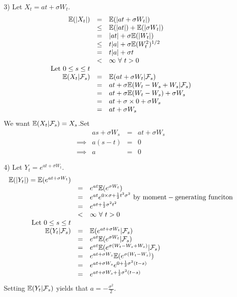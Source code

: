 \documentclass[11pt,a4paper]{article}
\begin{document}
\begin{itemize}
	\item[3)] Let $X_t=at+\sigma W_t$.
		\[\begin{array}{rcl}
		\mathbb{E}(|X_t|)&=&\mathbb{E}(|at+\sigma W_t|)\\
		&\leq&\mathbb{E}(|at|)+\mathbb{E}(|\sigma W_t|)\\
		&=&|at|+\sigma\mathbb{E}(|W_t|)\\
		&\leq&t|a|+\sigma\mathbb{E}(W_t^2)^{1/2}\\
		&=&t|a|+\sigma t\\
		&<&\infty\ \forall\ t>0\\
		\mathrm{Let}\ 0\leq s\leq t\\
		\mathbb{E}(X_t|\mathcal{F}_s)&=&\mathbb{E}(at+\sigma W_t|\mathcal{F}_s)\\
		&=&at+\sigma\mathbb{E}(W_t-W_s+W_s|\mathcal{F}_s)\\
		&=&at+\sigma\mathbb{E}(W_t-W_s)+\sigma W_s\\
		&=&at+\sigma\times0+\sigma W_s\\
		&=&at+\sigma W_s
		\end{array}\]
		We want $\mathbb{E}(X_t|\mathcal{F}_s)=X_s$.Set
		\[\begin{array}{rrcl}
		&as+\sigma W_s&=&at+\sigma W_s\\
		\implies& a(s-t)&=&0\\
		\implies& a&=&0
		\end{array}\]
	\item[4)]Let $Y_t=e^{at+\sigma W_t}$.
	\[\begin{array}{rcl}
	\expect(|Y_t|)=\expect(e^{at+\sigma W_t})\\
	&=&e^{at}\expect(e^{\sigma W_t})\\
	&=&e^{at}e^{0\times\sigma+\frac{1}{2}t^2\sigma^2}\mathrm{\ by\ moment-generating\ funciton}\\
	&=&e^{at+\frac{1}{2}\sigma^2t^2}\\
	&<&\infty\ \forall\ t>0\\
	\mathrm{Let}\ 0\leq s\leq t\\
	\expect(Y_t|\mathcal{F}_s)&=&\expect(e^{at+\sigma W_t}|\mathcal{F}_s)\\
	&=&e^{at}\expect(e^{\sigma W_t}|\mathcal{F}_s)\\
	&=&e^{at}\expect(e^{\sigma(W_t-W_s+W_s)}|\mathcal{F}_s)\\
	&=&e^{at+\sigma W_s}\expect(e^{\sigma(W_t-W_s)})\\
	&=&e^{at+\sigma W_s}e^{0+\frac{1}{2}\sigma^2(t-s)}\\
	&=&e^{at+\sigma W_s+\frac{1}{2}\sigma^2(t-s)}
	\end{array}\]
	Setting $\mathbb{E}(Y_t|\mathcal{F}_s)$ yields that $a=-\frac{\sigma^2}{2}$.
\end{itemize}
\end{document}
